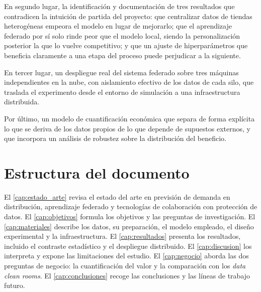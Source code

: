 En segundo lugar, la identificación y documentación de tres resultados que contradicen la
intuición de partida del proyecto: que centralizar datos de tiendas heterogéneas empeora el modelo
en lugar de mejorarlo; que el aprendizaje federado por sí solo rinde peor que el modelo local,
siendo la personalización posterior la que lo vuelve competitivo; y que un ajuste de
hiperparámetros que beneficia claramente a una etapa del proceso puede perjudicar a la siguiente.

En tercer lugar, un despliegue real del sistema federado sobre tres máquinas independientes en la
nube, con aislamiento efectivo de los datos de cada silo, que traslada el experimento desde el
entorno de simulación a una infraestructura distribuida.

Por último, un modelo de cuantificación económica que separa de forma explícita lo que se deriva de
los datos propios de lo que depende de supuestos externos, y que incorpora un análisis de robustez
sobre la distribución del beneficio.

\section{Estructura del documento}

El \cref{cap:estado_arte} revisa el estado del arte en previsión de demanda en distribución,
aprendizaje federado y tecnologías de colaboración con protección de datos. El
\cref{cap:objetivos} formula los objetivos y las preguntas de investigación. El
\cref{cap:materiales} describe los datos, su preparación, el modelo empleado, el diseño
experimental y la infraestructura. El \cref{cap:resultados} presenta los resultados, incluido el
contraste estadístico y el despliegue distribuido. El \cref{cap:discusion} los interpreta y expone
las limitaciones del estudio. El \cref{cap:negocio} aborda las dos preguntas de negocio: la
cuantificación del valor y la comparación con los \emph{data clean rooms}. El
\cref{cap:conclusiones} recoge las conclusiones y las líneas de trabajo futuro.
